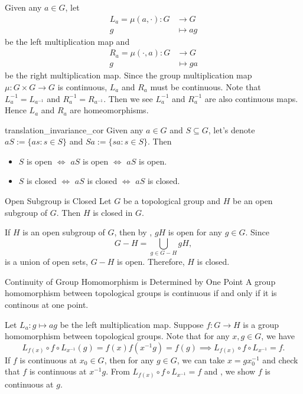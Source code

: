 \documentclass{report}
\begin{document}
\begin{prf}
	Given any $a\in G$, let
	\begin{align*}
		L_a=\mu(a,\cdot):G & \longrightarrow G \\
		g                  & \longmapsto ag
	\end{align*}
	be the left multiplication map and
	\begin{align*}
		R_a=\mu(\cdot,a):G & \longrightarrow G \\
		g                  & \longmapsto ga
	\end{align*}
	be the right multiplication map. Since the group multiplication map $\mu:G\times G\to G$ is continuous, $L_a$ and $R_a$ must be continuous. Note that $L_a^{-1}=L_{a^{-1}}$ and $R_a^{-1}=R_{a^{-1}}$. Then we see $L_a^{-1}$ and $R_a^{-1}$ are also continuous maps. Hence $L_a$ and $R_a$ are homeomorphisms.
\end{prf}


\begin{corollary}{}{translation_invariance_cor}
	Given any $a \in G$ and $S \subseteq G$, let's denote $a S:=\{a s: s \in S\}$ and $S a:=\{s a: s \in S\}$. Then
	\begin{itemize}
		\item $S$ is open $\iff$ $a S$ is open $\iff$ $a S$ is open.
		\item $S$ is closed $\iff$ $a S$ is closed $\iff$ $a S$ is closed.
	\end{itemize}
\end{corollary}

\begin{proposition}{Open Subgroup is Closed}{}
	Let $G$ be a topological group and $H$ be an open subgroup of $G$. Then $H$ is closed in $G$.
\end{proposition}
\begin{prf}
	If $H$ is an open subgroup of $G$, then	by , $gH$ is open for any $g\in G$. 
	Since
	\[
	G-H=\bigcup_{g\in G-H} gH,
	\]
	is a union of open sets, $G-H$ is open. Therefore, $H$ is closed.
\end{prf}

\begin{proposition}{Continuity of Group Homomorphism is Determined by One Point}{}
	A group homomorphism between topological groups is continuous if and only if it is continous at one point.
\end{proposition}
\begin{prf}
	Let $L_a: g\mapsto ag$ be the left multiplication map. Suppose $f:G\to H$ is a group homomorphism between topological groups. Note that for any $x,g\in G$, we have 
	\[
	 L_{f(x)}\circ f\circ L_{x^{-1}}(g)=f(x)f(x^{-1}g)=f(g)\implies L_{f(x)}\circ f\circ L_{x^{-1}}=f.
	\]
	If $f$ is continuous at $x_0 \in G$, then for any $g\in G$, we can take $x=gx_0^{-1}$ and check that $f$ is continuous at $x^{-1}g$. From $L_{f(x)}\circ f\circ L_{x^{-1}}=f$ and , we show $f$ is continuous at $g$. 
\end{prf}
\end{document}

